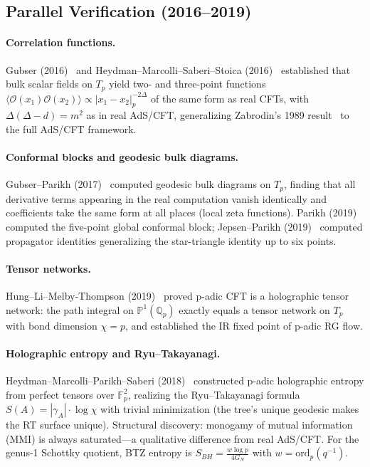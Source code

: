 \documentclass[11pt,a4paper]{article}
\newcommand{\Qp}{\mathbb{Q}_p}
\newcommand{\Fp}{\mathbb{F}_p}
\newcommand{\Pone}{\mathbb{P}^1}
\newcommand{\Tp}{T_p}
\newcommand{\OO}{\mathcal{O}}
\newcommand{\normp}[1]{|#1|_p}
\begin{document}
\subsection{Parallel Verification (2016--2019)}

\paragraph{Correlation functions.}

Gubser (2016)~\cite{G16} and Heydman--Marcolli--Saberi--Stoica (2016)~\cite{HMSS16} established that bulk scalar fields on $\Tp$ yield two- and three-point functions $\langle \OO(x_1) \OO(x_2) \rangle \propto \normp{x_1 - x_2}^{-2\Delta}$ of the same form as real CFTs, with $\Delta(\Delta-d)=m^2$ as in real AdS/CFT, generalizing Zabrodin's 1989 result~\cite{CMZ89} to the full AdS/CFT framework.

\paragraph{Conformal blocks and geodesic bulk diagrams.}
Gubser--Parikh (2017)~\cite{GP17} computed geodesic bulk diagrams on $\Tp$, finding that all derivative terms appearing in the real computation vanish identically and coefficients take the same form at all places (local zeta functions). Parikh (2019)~\cite{P19} computed the five-point global conformal block; Jepsen--Parikh (2019)~\cite{JP19a} computed propagator identities generalizing the star-triangle identity up to six points.

\paragraph{Tensor networks.}
Hung--Li--Melby-Thompson (2019)~\cite{HLM19} proved p-adic CFT is a holographic tensor network: the path integral on $\Pone(\Qp)$ exactly equals a tensor network on $\Tp$ with bond dimension $\chi = p$, and established the IR fixed point of p-adic RG flow.

\paragraph{Holographic entropy and Ryu--Takayanagi.}
Heydman--Marcolli--Parikh--Saberi (2018)~\cite{HMPS18} constructed p-adic holographic entropy from perfect tensors over $\Fp^2$, realizing the Ryu--Takayanagi formula~\cite{RT06a,RT06b} $S(A) = |\gamma_A| \cdot \log \chi$ with trivial minimization (the tree's unique geodesic makes the RT surface unique). Structural discovery: monogamy of mutual information (MMI) is always saturated---a qualitative difference from real AdS/CFT. For the genus-1 Schottky quotient, BTZ entropy is $S_{BH} = \frac{w \log p}{4 G_N}$ with $w = \mathrm{ord}_p(q^{-1})$.
\end{document}
